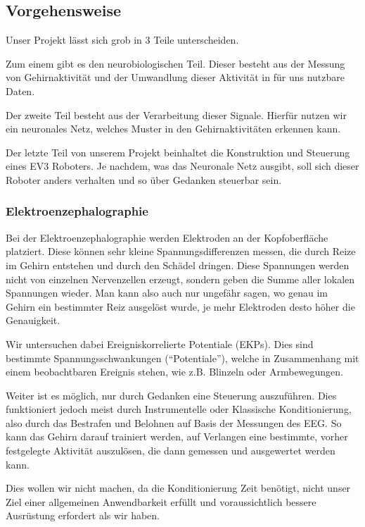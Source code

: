 \documentclass{scrartcl}
\begin{document}
	\subsection{Vorgehensweise}

	Unser Projekt lässt sich grob in 3 Teile unterscheiden.

	Zum einem gibt es den neurobiologischen Teil. Dieser besteht aus der Messung von Gehirnaktivität und der Umwandlung dieser Aktivität in für uns nutzbare Daten.
	
	Der zweite Teil besteht aus der Verarbeitung dieser Signale. Hierfür nutzen wir ein neuronales Netz, welches Muster in den Gehirnaktivitäten erkennen kann.
	
	Der letzte Teil von unserem Projekt beinhaltet die Konstruktion und Steuerung eines EV3 Roboters. Je nachdem, was das Neuronale Netz ausgibt, soll sich dieser Roboter anders verhalten und so über Gedanken steuerbar sein.	

	\subsubsection{Elektroenzephalographie}

	Bei der Elektroenzephalographie werden Elektroden an der Kopfoberfläche platziert. Diese können sehr kleine Spannungsdifferenzen messen, die durch Reize im Gehirn entstehen und durch den Schädel dringen. Diese Spannungen werden nicht von einzelnen Nervenzellen erzeugt, sondern geben die Summe aller lokalen Spannungen wieder. Man kann also auch nur ungefähr sagen, wo genau im Gehirn ein bestimmter Reiz ausgelöst wurde, je mehr Elektroden desto höher die Genauigkeit. \cite{wiki:Elektroenzephalografie}

	Wir untersuchen dabei Ereigniskorrelierte Potentiale (EKPs). Dies sind bestimmte Spannungsschwankungen (\enquote{Potentiale}), welche in Zusammenhang mit einem beobachtbaren Ereignis stehen, wie z.B. Blinzeln oder Armbewegungen.

	Weiter ist es möglich, nur durch Gedanken eine Steuerung auszuführen. Dies funktioniert jedoch meist durch Instrumentelle oder Klassische Konditionierung, also durch das Bestrafen und Belohnen auf Basis der Messungen des EEG. So kann das Gehirn darauf trainiert werden, auf Verlangen eine bestimmte, vorher festgelegte Aktivität auszulösen, die dann gemessen und ausgewertet werden kann. 

	Dies wollen wir nicht machen, da die Konditionierung Zeit benötigt, nicht unser Ziel einer allgemeinen Anwendbarkeit erfüllt und voraussichtlich bessere Ausrüstung erfordert als wir haben.
\end{document}
